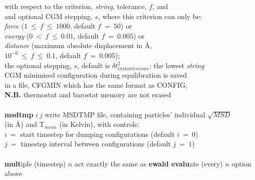 \begin{tabbing}
\>                                              \> with respect to the criterion, {\em string}, tolerance, $f$, and \\
\>                                              \> and optional CGM stepping, $s$, where this criterion can only be: \\
\>                                              \> {\em force} ($1~\le~f~\le~1000$, default $f~=~50$) or \\
\>                                              \> {\em energy} ($0~<~f~\le~0.01$, default $f~=~0.005$) or \\
\>                                              \> {\em distance} (maximum absolute displacement in \AA, \\
\>                                              \> $10^{-6}~\le~f~\le~0.1$, default $f~=~0.005$); \\
\>                                              \> the optional stepping, $s$, default is $\delta t_{instanteneous}^{2}$; the lowest {\em string} \\
\>                                              \> CGM minimised configuration during equilibration is saved \\
\>                                              \> in a file, CFGMIN which has the same format as CONFIG, \\
\>                                              \> {\bf N.B.} thermostat and barostat memory are not erased \\
\>                                              \> \\
\> {\bf msdtmp} $i~j$                           \> write MSDTMP file, containing particles' individual $\sqrt{MSD}$ \\
\>                                              \> (in \AA) and T$_{mean}$ (in Kelvin), with controls: \\
\>                                              \> $i~=$ start timestep for dumping configurations (default $i~=~0$) \\
\>                                              \> $j~=$ timestep interval between configurations (default $j~=~1$) \\
\>                                              \> \\
\> {\bf mult}iple (timestep) $n$                \> act exactly the same as {\bf ewald evalu}ate (every) $n$ option above \\
\>                                              \> \\

\end{tabbing}
